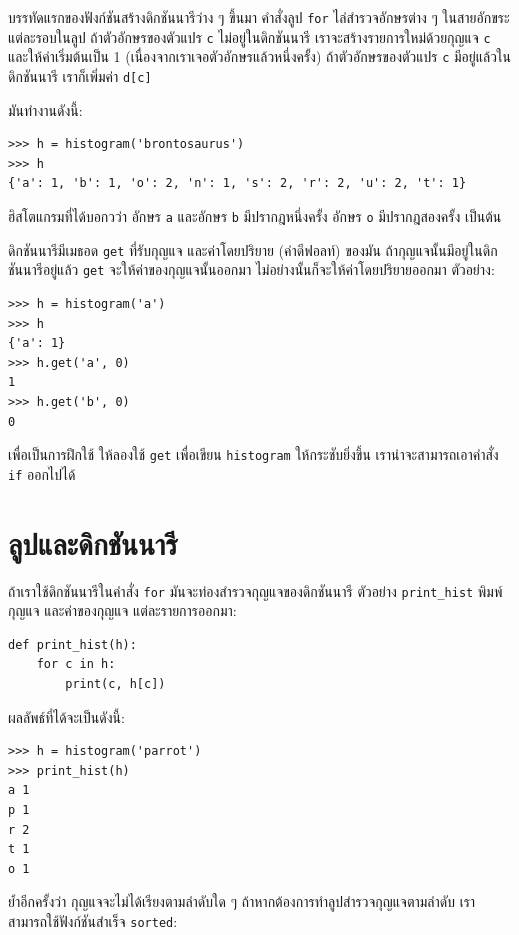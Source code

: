 บรรทัดแรกของฟังก์ชันสร้างดิกชันนารีว่าง ๆ ขึ้นมา
คำสั่งลูป \texttt{for} ไล่สำรวจอักษรต่าง ๆ ในสายอักขระ
แต่ละรอบในลูป ถ้าตัวอักษรของตัวแปร \texttt{c} ไม่อยู่ในดิกชันนารี
เราจะสร้างรายการใหม่ด้วยกุญแจ \texttt{c} และให้ค่าเริ่มต้นเป็น 1 (เนื่องจากเราเจอตัวอักษรแล้วหนึ่งครั้ง)
ถ้าตัวอักษรของตัวแปร \texttt{c} มีอยู่แล้วในดิกชันนารี เราก็เพิ่มค่า \texttt{d[c]}

มันทำงานดังนี้:

\begin{verbatim}
>>> h = histogram('brontosaurus')
>>> h
{'a': 1, 'b': 1, 'o': 2, 'n': 1, 's': 2, 'r': 2, 'u': 2, 't': 1}
\end{verbatim}
%
ฮิสโตแกรมที่ได้บอกวว่า อักษร \verb|a| และอักษร \verb|b| มีปรากฎหนึ่งครั้ง 
อักษร \verb|o| มีปรากฎสองครั้ง เป็นต้น

ดิกชันนารีมีเมธอด \texttt{get} ที่รับกุญแจ และค่าโดยปริยาย (ค่าดีฟอลท์) ของมัน
ถ้ากุญแจนั้นมีอยู่ในดิกชันนารีอยู่แล้ว
\texttt{get} จะให้ค่าของกุญแจนั้นออกมา
ไม่อย่างนั้นก็จะให้ค่าโดยปริยายออกมา
ตัวอย่าง:

\begin{verbatim}
>>> h = histogram('a')
>>> h
{'a': 1}
>>> h.get('a', 0)
1
>>> h.get('b', 0)
0
\end{verbatim}
%
เพื่อเป็นการฝึกใช้ 
ให้ลองใช้ \texttt{get} เพื่อเขียน \texttt{histogram} ให้กระชับยิ่งขึ้น
เราน่าจะสามารถเอาคำสั่ง \texttt{if} ออกไปได้


\section{ลูปและดิกชันนารี}

ถ้าเราใช้ดิกชันนารีในคำสั่ง \texttt{for}
มันจะท่องสำรวจกุญแจของดิกชันนารี
ตัวอย่าง
\verb"print_hist"
พิมพ์กุญแจ และค่าของกุญแจ แต่ละรายการออกมา:

\begin{verbatim}
def print_hist(h):
    for c in h:
        print(c, h[c])
\end{verbatim}
%
ผลลัพธ์ที่ได้จะเป็นดังนี้:

\begin{verbatim}
>>> h = histogram('parrot')
>>> print_hist(h)
a 1
p 1
r 2
t 1
o 1
\end{verbatim}
%
ย้ำอีกครั้งว่า กุญแจจะไม่ได้เรียงตามลำดับใด ๆ
ถ้าหากต้องการทำลูปสำรวจกุญแจตามลำดับ เราสามารถใช้ฟังก์ชันสำเร็จ \texttt{sorted}:

